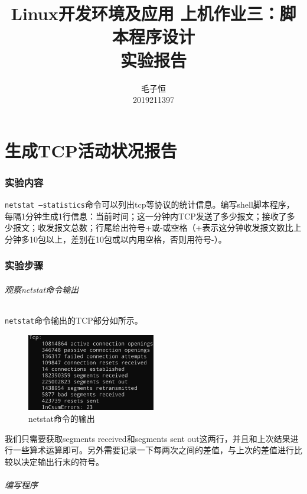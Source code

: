 \documentclass[lang=cn,11pt,a4paper,cite=authornum]{paper}
\title{Linux开发环境及应用 上机作业三：脚本程序设计 \\ 实验报告}
\author{毛子恒 \\ 2019211397}
\institute{北京邮电大学\ 计算机学院}
\date{\zhtoday}
\begin{document}
\maketitle

\part{生成TCP活动状况报告}

\section{实验内容}

\texttt{netstat --statistics}命令可以列出tcp等协议的统计信息。编写shell脚本程序，每隔1分钟生成1行信息：当前时间；这一分钟内TCP发送了多少报文；接收了多少报文；收发报文总数；行尾给出符号+或-或空格（+表示这分钟收发报文数比上分钟多10包以上，差别在10包或以内用空格，否则用符号-）。

\section{实验步骤}

\paragraph{观察netstat命令输出}

\texttt{netstat}命令输出的TCP部分如所示。 

\begin{figure}[!htb]
    \centering
    \includegraphics[width=0.5\textwidth]{./images/l3-p1.jpg}
    \caption{netstat命令的输出\label{fig:p1}}
\end{figure}

我们只需要获取segments received和segments sent out这两行，并且和上次结果进行一些算术运算即可。另外需要记录一下每两次之间的差值，与上次的差值进行比较以决定输出行末的符号。

\paragraph{编写程序}
\end{document}
